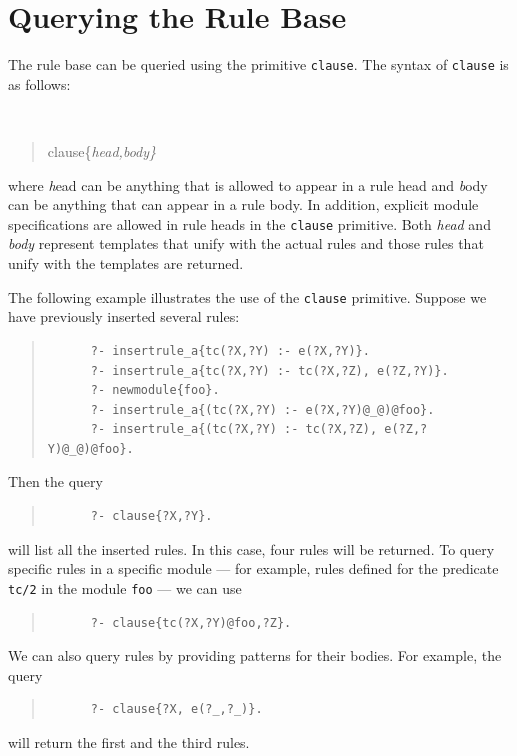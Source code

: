 \documentclass[11pt]{article}
\begin{document}
\section{Querying the Rule Base}
\label{sec:clause}

The rule base can be queried using the primitive {\tt clause}.  The
  syntax of {\tt clause} is as follows:

{\tt
\begin{quote}
clause\{\it{head,body}\}
\end{quote}
}
\noindent
where {\emph head} can be anything that is allowed to appear in a rule
head and {\emph body} can be anything that
can appear in a rule body. In addition, explicit module specifications are
allowed in rule heads in the {\tt clause} primitive. 
Both \emph{head} and \emph{body} represent
templates that unify with the actual rules and those rules that unify
with the templates are returned.

The following example illustrates the use of the {\tt clause} primitive.
Suppose we have previously inserted several rules:
\begin{quote}
\begin{verbatim}
      ?- insertrule_a{tc(?X,?Y) :- e(?X,?Y)}.
      ?- insertrule_a{tc(?X,?Y) :- tc(?X,?Z), e(?Z,?Y)}.
      ?- newmodule{foo}.
      ?- insertrule_a{(tc(?X,?Y) :- e(?X,?Y)@_@)@foo}.
      ?- insertrule_a{(tc(?X,?Y) :- tc(?X,?Z), e(?Z,?Y)@_@)@foo}.
\end{verbatim}
\end{quote}

Then the query
\begin{quote}
\begin{verbatim}
      ?- clause{?X,?Y}.
\end{verbatim}
\end{quote}
\noindent
will list all the inserted rules.  In this case, four rules will be
returned.  To query specific rules in a specific module --- for example,
rules defined for the predicate {\tt tc/2} in the module {\tt foo} --- we
can use
\begin{quote}
\begin{verbatim}
      ?- clause{tc(?X,?Y)@foo,?Z}.
\end{verbatim}
\end{quote}
We can also query rules by providing patterns for their bodies. For
example, the query
\begin{quote}
\begin{verbatim}
      ?- clause{?X, e(?_,?_)}.
\end{verbatim}
\end{quote}
\noindent
will return the first and the third rules.
\end{document}

